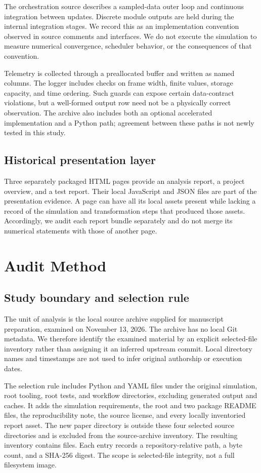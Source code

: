 \documentclass[11pt,a4paper]{article}
\begin{document}
The orchestration source describes a sampled-data outer loop and continuous integration between updates. Discrete module outputs are held during the internal integration stages. We record this as an implementation convention observed in source comments and interfaces. We do not execute the simulation to measure numerical convergence, scheduler behavior, or the consequences of that convention.

Telemetry is collected through a preallocated buffer and written as named columns. The logger includes checks on frame width, finite values, storage capacity, and time ordering. Such guards can expose certain data-contract violations, but a well-formed output row need not be a physically correct observation. The archive also includes both an optional accelerated implementation and a Python path; agreement between these paths is not newly tested in this study.

\subsection{Historical presentation layer}
Three separately packaged HTML pages provide an analysis report, a project overview, and a test report. Their local JavaScript and JSON files are part of the presentation evidence. A page can have all its local assets present while lacking a record of the simulation and transformation steps that produced those assets. Accordingly, we audit each report bundle separately and do not merge its numerical statements with those of another page.

\section{Audit Method}
\label{sec:method}
\subsection{Study boundary and selection rule}
The unit of analysis is the local source archive supplied for manuscript preparation, examined on November 13, 2026. The archive has no local Git metadata. We therefore identify the examined material by an explicit selected-file inventory rather than assigning it an inferred upstream commit. Local directory names and timestamps are not used to infer original authorship or execution dates.

The selection rule includes Python and YAML files under the original simulation, root tooling, root tests, and workflow directories, excluding generated output and caches. It adds the simulation requirements, the root and two package README files, the reproducibility note, the source license, and every locally inventoried report asset. The new paper directory is outside these four selected source directories and is excluded from the source-archive inventory. The resulting inventory contains \SelectedFiles files. Each entry records a repository-relative path, a byte count, and a SHA-256 digest. The scope is selected-file integrity, not a full filesystem image.
\end{document}
